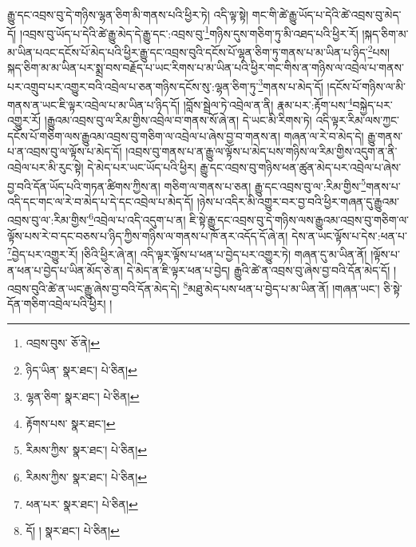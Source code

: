 རྒྱུ་དང་འབྲས་བུ་དེ་གཉིས་ལྷན་ཅིག་མི་གནས་པའི་ཕྱིར་ཏེ། འདི་ལྟ་སྟེ། གང་གི་ཚེ་རྒྱུ་ཡོད་པ་དེའི་ཚེ་འབྲས་བུ་མེད་དོ། །འབྲས་བུ་ཡོད་པ་དེའི་ཚེ་རྒྱུ་མེད་དེ་རྒྱུ་དང་:འབྲས་བུ་\footnote{འབྲས་བུས་  ཅོ་ནེ། }གཉིས་དུས་གཅིག་ཏུ་མི་འཐད་པའི་ཕྱིར་རོ། །སྐད་ཅིག་མ་མ་ཡིན་པའང་དངོས་པོ་མེད་པའི་ཕྱིར་རྒྱུ་དང་འབྲས་བུའི་དངོས་པོ་ལྷན་ཅིག་ཏུ་གནས་པ་མ་ཡིན་པ་ཉིད་\footnote{ཉིད་ཡིན་  སྣར་ཐང་།  པེ་ཅིན། }པས། སྐད་ཅིག་མ་མ་ཡིན་པར་སྨྲ་བས་བརྗོད་པ་ཡང་རིགས་པ་མ་ཡིན་པའི་ཕྱིར་གང་གིས་ན་གཉིས་ལ་འབྲེལ་པ་གནས་པར་འགྲུབ་པར་འགྱུར་བའི་འབྲེལ་པ་ཅན་གཉིས་དངོས་སུ་:ལྷན་ཅིག་ཏུ་\footnote{ལྷན་ཅིག་  སྣར་ཐང་།  པེ་ཅིན། }གནས་པ་མེད་དོ། །དངོས་པོ་གཉིས་ལ་མི་གནས་ན་ཡང་ཇི་ལྟར་འབྲེལ་པ་མ་ཡིན་པ་ཉིད་དོ། །བློས་སྦྲེལ་ཏེ་འབྲེལ་ན་ནི། རྣམ་པར་:རྟོག་པས་\footnote{རྟོགས་པས་  སྣར་ཐང་། }བསྐྱེད་པར་འགྱུར་རོ། །རྒྱུའམ་འབྲས་བུ་ལ་རིམ་གྱིས་འབྲེལ་བ་གནས་སོ་ཞེ་ན། དེ་ཡང་མི་རིགས་ཏེ། འདི་ལྟར་རིམ་ལས་ཀྱང་དངོས་པོ་གཅིག་ལས་རྒྱུའམ་འབྲས་བུ་གཅིག་ལ་འབྲེལ་པ་ཞེས་བྱ་བ་གནས་ན། གཞན་ལ་རེ་བ་མེད་དེ། རྒྱུ་གནས་པ་ན་འབྲས་བུ་ལ་ལྟོས་པ་མེད་དོ། །འབྲས་བུ་གནས་པ་ན་རྒྱུ་ལ་ལྟོས་པ་མེད་པས་གཉིས་ལ་རིམ་གྱིས་འདུག་ན་ནི་འབྲེལ་པར་མི་རུང་སྟེ། དེ་མེད་པར་ཡང་ཡོད་པའི་ཕྱིར། རྒྱུ་དང་འབྲས་བུ་གཉིས་ཕན་ཚུན་མེད་པར་འབྲེལ་པ་ཞེས་བྱ་བའི་དོན་ཡོད་པའི་གཏན་ཚིགས་ཀྱིས་ན། གཅིག་ལ་གནས་པ་ཅན། རྒྱུ་དང་འབྲས་བུ་ལ་:རིམ་གྱིས་\footnote{རིམས་ཀྱིས་  སྣར་ཐང་།  པེ་ཅིན། }གནས་པ་འདི་དང་གང་ལ་རེ་བ་མེད་པ་དེ་དང་འབྲེལ་པ་མེད་དོ། །ཉེས་པ་འདིར་མི་འགྱུར་བར་བྱ་བའི་ཕྱིར་གཞན་དུ་རྒྱུའམ་འབྲས་བུ་ལ་:རིམ་གྱིས་\footnote{རིམས་ཀྱིས་  སྣར་ཐང་།  པེ་ཅིན། }འབྲེལ་པ་འདི་འདུག་པ་ན། ཇི་སྟེ་རྒྱུ་དང་འབྲས་བུ་དེ་གཉིས་ལས་རྒྱུའམ་འབྲས་བུ་གཅིག་ལ་ལྟོས་པས་རེ་བ་དང་བཅས་པ་ཉིད་ཀྱིས་གཉིས་ལ་གནས་པ་ཁོ་ནར་འདོད་དོ་ཞེ་ན། དེས་ན་ཡང་ལྟོས་པ་དེས་:ཕན་པ་\footnote{ཕན་པར་  སྣར་ཐང་།  པེ་ཅིན། }བྱེད་པར་འགྱུར་རོ། །ཅིའི་ཕྱིར་ཞེ་ན། འདི་ལྟར་ལྟོས་པ་ཕན་པ་བྱེད་པར་འགྱུར་ཏེ། གཞན་དུ་མ་ཡིན་ནོ། །ལྟོས་པ་ན་ཕན་པ་བྱེད་པ་ཡིན་མོད་ཅེ་ན། དེ་མེད་ན་ཇི་ལྟར་ཕན་པ་བྱེད། རྒྱུའི་ཚེ་ན་འབྲས་བུ་ཞེས་བྱ་བའི་དོན་མེད་དོ། །འབྲས་བུའི་ཚེ་ན་ཡང་རྒྱུ་ཞེས་བྱ་བའི་དོན་མེད་དེ། \footnote{དོ། །   སྣར་ཐང་།  པེ་ཅིན། }མཐུ་མེད་པས་ཕན་པ་བྱེད་པ་མ་ཡིན་ནོ། །གཞན་ཡང་། ཅི་སྟེ་དོན་གཅིག་འབྲེལ་པའི་ཕྱིར། །
